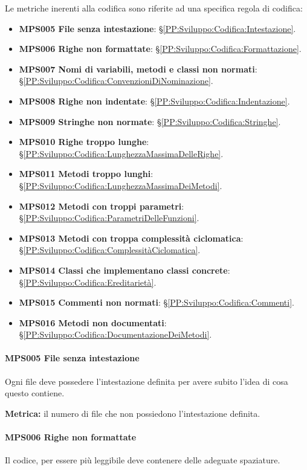         Le metriche inerenti alla codifica sono riferite ad una specifica regola di codifica:
        \begin{itemize}
            \item \textbf{MPS005 File senza intestazione}: \S\ref{PP:Sviluppo:Codifica:Intestazione}.
            \item \textbf{MPS006 Righe non formattate}: \S\ref{PP:Sviluppo:Codifica:Formattazione}.
            \item \textbf{MPS007 Nomi di variabili, metodi e classi non normati}: \S\ref{PP:Sviluppo:Codifica:ConvenzioniDiNominazione}.
            \item \textbf{MPS008 Righe non indentate}: \S\ref{PP:Sviluppo:Codifica:Indentazione}.
            \item \textbf{MPS009 Stringhe non normate}: \S\ref{PP:Sviluppo:Codifica:Stringhe}.
            \item \textbf{MPS010 Righe troppo lunghe}: \S\ref{PP:Sviluppo:Codifica:LunghezzaMassimaDelleRighe}.
            \item \textbf{MPS011 Metodi troppo lunghi}: \S\ref{PP:Sviluppo:Codifica:LunghezzaMassimaDeiMetodi}.
            \item \textbf{MPS012 Metodi con troppi parametri}: \S\ref{PP:Sviluppo:Codifica:ParametriDelleFunzioni}.
            \item \textbf{MPS013 Metodi con troppa complessità ciclomatica}: \S\ref{PP:Sviluppo:Codifica:ComplessitàCiclomatica}.
            \item \textbf{MPS014 Classi che implementano classi concrete}: \S\ref{PP:Sviluppo:Codifica:Ereditarietà}.
            \item \textbf{MPS015 Commenti non normati}: \S\ref{PP:Sviluppo:Codifica:Commenti}.
            \item \textbf{MPS016 Metodi non documentati}: \S\ref{PP:Sviluppo:Codifica:DocumentazioneDeiMetodi}.
        \end{itemize}

        \paragraph{MPS005 File senza intestazione}
        Ogni file deve possedere l'intestazione definita per avere subito l'idea di cosa questo contiene.

        \textbf{Metrica:} il numero di file che non possiedono l'intestazione definita.

        \paragraph{MPS006 Righe non formattate}
        Il codice, per essere più leggibile deve contenere delle adeguate spaziature.

